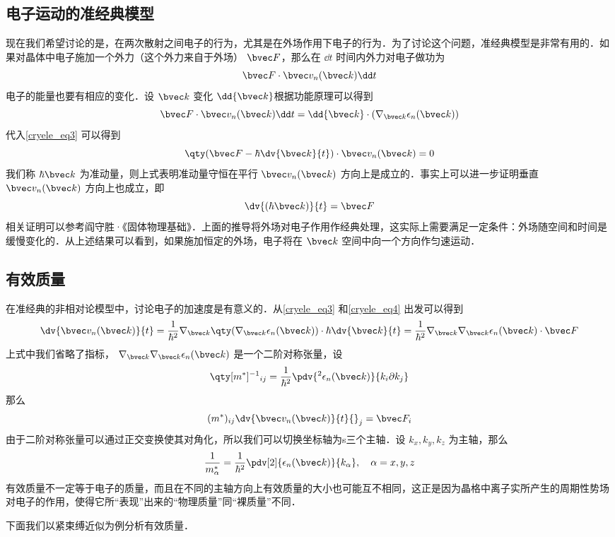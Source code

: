 \subsection{电子运动的准经典模型}
现在我们希望讨论的是，在两次散射之间电子的行为，尤其是在外场作用下电子的行为．为了讨论这个问题，准经典模型是非常有用的．如果对晶体中电子施加一个外力（这个外力来自于外场） $\bvec F$，那么在 $\dd t$ 时间内外力对电子做功为
\begin{equation}
\bvec F\cdot \bvec v_n(\bvec k)\dd t
\end{equation}
电子的能量也要有相应的变化．设 $\bvec k$ 变化 $\dd{\bvec k}$根据功能原理可以得到
\begin{equation}
\bvec F\cdot \bvec v_n(\bvec k)\dd t
=\dd {\bvec k}\cdot (\nabla_{\bvec k}\epsilon_n(\bvec k))
\end{equation}
代入\autoref{cryele_eq3} 可以得到
\begin{equation}
\qty(\bvec F-\hbar\dv{\bvec k}{t})\cdot \bvec v_n(\bvec k)=0
\end{equation}
我们称 $\hbar \bvec k$ 为准动量，则上式表明准动量守恒在平行 $\bvec v_n(\bvec k)$ 方向上是成立的．事实上可以进一步证明垂直 $\bvec v_n(\bvec k)$ 方向上也成立，即
\begin{equation}\label{cryele_eq4}
\dv{(\hbar \bvec k)}{t}=\bvec F
\end{equation}
相关证明可以参考阎守胜·《固体物理基础》\cite{阎守胜}．上面的推导将外场对电子作用作经典处理，这实际上需要满足一定条件：外场随空间和时间是缓慢变化的．从上述结果可以看到，如果施加恒定的外场，电子将在 $\bvec k$ 空间中向一个方向作匀速运动．
\subsection{有效质量}
在准经典的非相对论模型中，讨论电子的加速度是有意义的．从\autoref{cryele_eq3} 和\autoref{cryele_eq4} 出发可以得到
\begin{equation}
\dv{\bvec v_n(\bvec k)}{t}=\frac{1}{\hbar^2}\nabla_{\bvec k}\qty(\nabla_{\bvec k}\epsilon_n(\bvec k) )\cdot \hbar\dv{\bvec k}{t}=\frac{1}{\hbar^2}\nabla_{\bvec k}\nabla_{\bvec k}\epsilon_n(\bvec k) \cdot \bvec F
\end{equation}
上式中我们省略了指标， $\nabla_{\bvec k}\nabla_{\bvec k}\epsilon_n(\bvec k)$ 是一个二阶对称张量，设
\begin{equation}
\qty[m^{*}]^{-1}{}_{ij}=\frac{1}{\hbar^2}\pdv{{}^2\epsilon_n(\bvec k)}{k_i\partial k_j} 
\end{equation}
那么
\begin{equation}
(m^*)_{ij}\dv{\bvec v_n(\bvec k)}{t}{}_j=\bvec F_i
\end{equation}
由于二阶对称张量可以通过正交变换使其对角化，所以我们可以切换坐标轴为s三个主轴．设 $k_x,k_y,k_z$ 为主轴，那么
\begin{equation}
\frac{1}{m_\alpha^*}=\frac{1}{\hbar^2}\pdv[2]{\epsilon_n(\bvec k)}{k_\alpha},\quad \alpha=x,y,z
\end{equation}
有效质量不一定等于电子的质量，而且在不同的主轴方向上有效质量的大小也可能互不相同，这正是因为晶格中离子实所产生的周期性势场对电子的作用，使得它所“表现”出来的“物理质量”同“裸质量”不同．

下面我们以紧束缚近似为例分析有效质量．